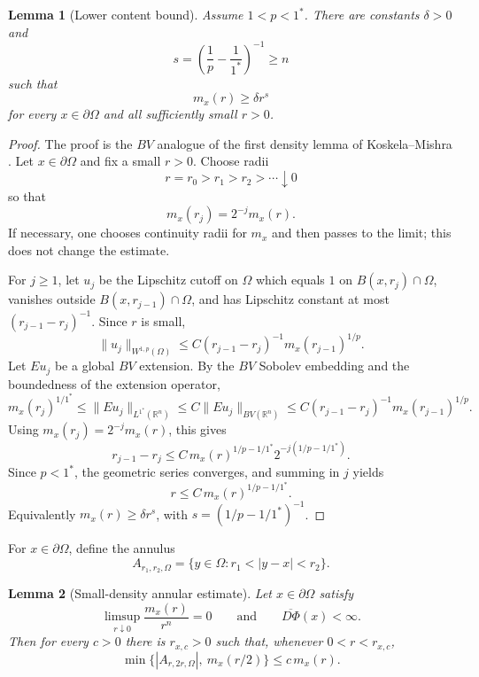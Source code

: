 \documentclass[11pt]{article}
\newtheorem{lemma}{Lemma}
\newcommand{\R}{\mathbb{R}}
\newcommand{\Om}{\Omega}
\newcommand{\onecrit}{1^\ast}
\begin{document}
\begin{lemma}[Lower content bound]\label{lem:lower}
Assume \(1<p<\onecrit\). There are constants \(\delta>0\) and
\[
  s=\left(\frac1p-\frac1{\onecrit}\right)^{-1}\ge n
\]
such that
\[
  m_x(r)\ge \delta r^s
\]
for every \(x\in\partial\Om\) and all sufficiently small \(r>0\).
\end{lemma}

\begin{proof}
The proof is the \(BV\) analogue of the first density lemma of
Koskela--Mishra \cite[Lemma 3.1]{KM}. Let \(x\in\partial\Om\) and fix a small
\(r>0\). Choose radii
\[
  r=r_0>r_1>r_2>\cdots\downarrow0
\]
so that
\[
  m_x(r_j)=2^{-j}m_x(r).
\]
If necessary, one chooses continuity radii for \(m_x\) and then passes to the
limit; this does not change the estimate.

For \(j\ge1\), let \(u_j\) be the Lipschitz cutoff on \(\Om\) which equals
\(1\) on \(B(x,r_j)\cap\Om\), vanishes outside \(B(x,r_{j-1})\cap\Om\), and
has Lipschitz constant at most \((r_{j-1}-r_j)^{-1}\). Since \(r\) is small,
\[
  \|u_j\|_{W^{1,p}(\Om)}
     \le C(r_{j-1}-r_j)^{-1}m_x(r_{j-1})^{1/p}.
\]
Let \(Eu_j\) be a global \(BV\) extension. By the \(BV\) Sobolev embedding and
the boundedness of the extension operator,
\[
  m_x(r_j)^{1/\onecrit}
      \le \|Eu_j\|_{L^{\onecrit}(\R^n)}
      \le C\|Eu_j\|_{BV(\R^n)}
      \le C(r_{j-1}-r_j)^{-1}m_x(r_{j-1})^{1/p}.
\]
Using \(m_x(r_j)=2^{-j}m_x(r)\), this gives
\[
  r_{j-1}-r_j
      \le C\,m_x(r)^{1/p-1/\onecrit}
             2^{-j(1/p-1/\onecrit)}.
\]
Since \(p<\onecrit\), the geometric series converges, and summing in \(j\)
yields
\[
  r\le C\,m_x(r)^{1/p-1/\onecrit}.
\]
Equivalently \(m_x(r)\ge\delta r^s\), with
\(s=(1/p-1/\onecrit)^{-1}\).
\end{proof}

For \(x\in\partial\Om\), define the annulus
\[
  A_{r_1,r_2,\Om}
     =\{y\in\Om:r_1<|y-x|<r_2\}.
\]

\begin{lemma}[Small-density annular estimate]\label{lem:min}
Let \(x\in\partial\Om\) satisfy
\[
  \limsup_{r\downarrow0}\frac{m_x(r)}{r^n}=0
  \qquad\text{and}\qquad
  \overline{D\Phi}(x)<\infty .
\]
Then for every \(c>0\) there is \(r_{x,c}>0\) such that, whenever
\(0<r<r_{x,c}\),
\[
  \min\{|A_{r,2r,\Om}|,\ m_x(r/2)\}\le c\,m_x(r).
\]
\end{lemma}
\end{document}
